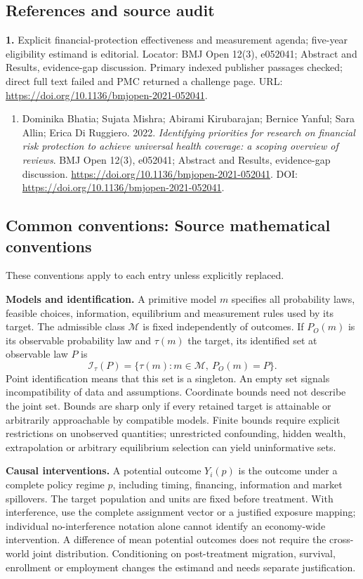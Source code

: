 \documentclass[11pt,a4paper]{article}
\begin{document}
\subsection*{References and source audit}
\textbf{1.} Explicit financial-protection effectiveness and measurement agenda; five-year eligibility estimand is editorial. Locator: BMJ Open 12(3), e052041; Abstract and Results, evidence-gap discussion. Primary indexed publisher passages checked; direct full text failed and PMC returned a challenge page. URL: \url{https://doi.org/10.1136/bmjopen-2021-052041}.
\begin{enumerate}\raggedright
\item\hypertarget{definitions:source:30007731:1}{} Dominika Bhatia; Sujata Mishra; Abirami Kirubarajan; Bernice Yanful; Sara Allin; Erica Di Ruggiero. 2022. \emph{Identifying priorities for research on financial risk protection to achieve universal health coverage: a scoping overview of reviews}. BMJ Open 12(3), e052041; Abstract and Results, evidence-gap discussion.
\url{https://doi.org/10.1136/bmjopen-2021-052041}.
DOI: \url{https://doi.org/10.1136/bmjopen-2021-052041}.
\end{enumerate}

\subsection*{Common conventions: Source mathematical conventions}

These conventions apply to each entry unless explicitly replaced.

\textbf{Models and identification.} A primitive model \(m\) specifies all probability laws, feasible choices, information, equilibrium and measurement rules used by its target. The admissible class \(\mathcal M\) is fixed independently of outcomes. If \(P_O(m)\) is its observable probability law and \(\tau(m)\) the target, its identified set at observable law \(P\) is
\[
 \mathcal I_\tau(P)=\{\tau(m):m\in\mathcal M,\ P_O(m)=P\}.
\]
Point identification means that this set is a singleton. An empty set signals incompatibility of data and assumptions. Coordinate bounds need not describe the joint set. Bounds are sharp only if every retained target is attainable or arbitrarily approachable by compatible models. Finite bounds require explicit restrictions on unobserved quantities; unrestricted confounding, hidden wealth, extrapolation or arbitrary equilibrium selection can yield uninformative sets.

\textbf{Causal interventions.} A potential outcome \(Y_i(p)\) is the outcome under a complete policy regime \(p\), including timing, financing, information and market spillovers. The target population and units are fixed before treatment. With interference, use the complete assignment vector or a justified exposure mapping; individual no-interference notation alone cannot identify an economy-wide intervention. A difference of mean potential outcomes does not require the cross-world joint distribution. Conditioning on post-treatment migration, survival, enrollment or employment changes the estimand and needs separate justification.
\end{document}
